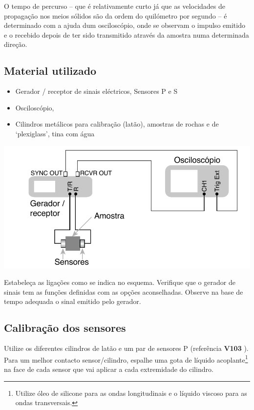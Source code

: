 \documentclass[a4paper,12pt]{article}
\begin{document}
O tempo de percurso -- que é relativamente curto já que as velocidades de propagação nos meios sólidos são da ordem do quilómetro por segundo -- é determinado com a ajuda dum osciloscópio, onde se observam o impulso emitido e o recebido depois de ter sido transmitido através da amostra numa determinada direção. 

\subsection{\sf Material utilizado}
\begin{itemize}
\item Gerador / receptor de sinais eléctricos, Sensores P e S
\item Osciloscópio,
\item Cilindros metálicos para calibração (latão), amostras de rochas e de ‘plexiglass’, tina com água
\end{itemize}

\begin{center}
	\includegraphics[width=0.7\linewidth]{esquema}
\end{center}


 Estabeleça as ligações como se indica no esquema. Verifique que o gerador de sinais tem as funções definidas com as opções aconselhadas.
Observe na base de tempo adequada o sinal emitido pelo gerador.

\subsection{\sf Calibração dos sensores}
Utilize os diferentes cilindros de latão e um par de sensores P (referência \textbf{V103} ). Para um melhor contacto sensor/cilindro, espalhe uma gota de líquido acoplante\footnote{Utilize óleo de silicone para as ondas longitudinais e o líquido viscoso para as ondas transversais.} na face de cada sensor que vai aplicar a cada extremidade do cilindro.
\end{document}
